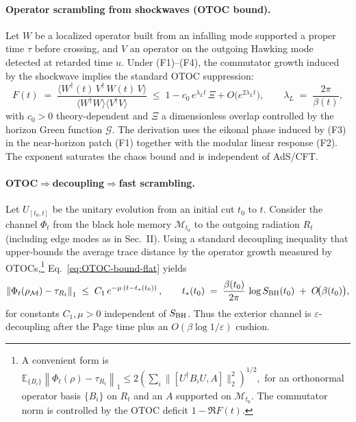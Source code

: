 \paragraph{Operator scrambling from shockwaves (OTOC bound).}
Let $W$ be a localized operator built from an infalling mode supported a proper time $\tau$ before crossing, and $V$ an operator on the outgoing Hawking mode detected at retarded time $u$. Under (F1)--(F4), the commutator growth induced by the shockwave implies the standard OTOC suppression:
\begin{equation}
  F(t)\;=\;\frac{\langle W^\dagger(t)\,V^\dagger\,W(t)\,V\rangle}{\langle W^\dagger W\rangle\langle V^\dagger V\rangle}
  \;\le\; 1 - c_0\, e^{\lambda_L t}\,\Xi + O\!\big(e^{2\lambda_L t}\big),
  \qquad \lambda_L \;=\; \frac{2\pi}{\beta(t)},
  \label{eq:OTOC-bound-flat}
\end{equation}
with $c_0>0$ theory-dependent and $\Xi$ a dimensionless overlap controlled by the horizon Green function $\mathcal{G}$. The derivation uses the eikonal phase induced by (F3) in the near-horizon patch (F1) together with the modular linear response (F2). The exponent saturates the chaos bound and is independent of AdS/CFT.

\paragraph{OTOC$\Rightarrow$decoupling$\Rightarrow$fast scrambling.}
Let $U_{[t_0,t]}$ be the unitary evolution from an initial cut $t_0$ to $t$. Consider the channel $\Phi_t$ from the black hole memory $\mathcal{M}_{t_0}$ to the outgoing radiation $R_t$ (including edge modes as in Sec.~II). Using a standard decoupling inequality that upper-bounds the average trace distance by the operator growth measured by OTOCs,\footnote{A convenient form is
\(
\mathbb{E}_{\{B_i\}}\left\| \Phi_t(\rho)-\tau_{R_t}\right\|_1
\le 2\left(\sum_i \| [U^\dagger B_i U, A]\|_2^2\right)^{1/2},
\)
for an orthonormal operator basis $\{B_i\}$ on $R_t$ and an $A$ supported on $\mathcal{M}_{t_0}$. The commutator norm is controlled by the OTOC deficit $1-\Re F(t)$.} Eq.~\eqref{eq:OTOC-bound-flat} yields
\begin{equation}
  \left\| \Phi_t(\rho_{\mathcal{M}})-\tau_{R_t}\right\|_1
  \;\le\; C_1\, e^{-\mu\,(t-t_*(t_0))}\,,
  \qquad
  t_*(t_0)\;=\;\frac{\beta(t_0)}{2\pi}\,\log S_{\rm BH}(t_0)\;+\;O\!\big(\beta(t_0)\big),
  \label{eq:fast-scrambling-flat}
\end{equation}
for constants $C_1,\mu>0$ independent of $S_{\rm BH}$. Thus the exterior channel is $\varepsilon$-decoupling after the Page time plus an $O(\beta\log 1/\varepsilon)$ cushion.

